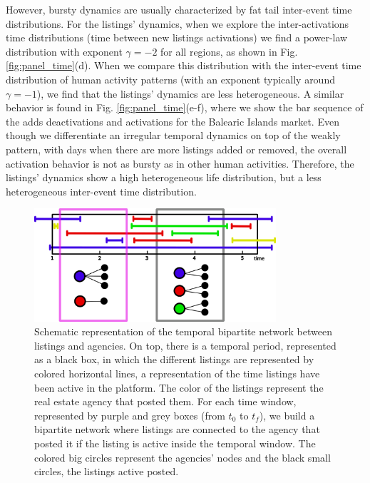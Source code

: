 However, bursty dynamics are usually characterized by fat tail inter-event time distributions. For the listings' dynamics, when we explore the inter-activations time distributions (time between new listings activations) we find a power-law distribution with exponent $\gamma = -2$ for all regions, as shown in Fig. \ref{fig:panel_time}(d). When we compare this distribution with the inter-event time distribution of human activity patterns (with an exponent typically around $\gamma = -1$), we find that the listings' dynamics are less heterogeneous. A similar behavior is found in Fig. \ref{fig:panel_time}(e-f), where we show the bar sequence of the adds deactivations and activations for the Balearic Islands market. Even though we differentiate an irregular temporal dynamics on top of the weakly pattern, with days when there are more listings added or removed, the overall activation behavior is not as bursty as in other human activities. Therefore, the listings' dynamics show a high heterogeneous life distribution, but a less heterogeneous inter-event time distribution.

\begin{figure}
    \vspace{0.2 cm}
    \centering
    \includegraphics[width = 0.8\textwidth]{Figs/Idealista_dynamics/temporal_bipartite.pdf}
	\caption[Housing market as a temporal bipartite network.]{Schematic representation of the temporal bipartite network between listings and agencies. On top, there is a temporal period, represented as a black box, in which the different listings are represented by colored horizontal lines, a representation of the time listings have been active in the platform. The color of the listings represent the real estate agency that posted them. For each time window, represented by purple and grey boxes (from $t_0$ to $t_f$), we build a bipartite network where listings are connected to the agency that posted it if the listing is active inside the temporal window. The colored big circles represent the agencies' nodes and the black small circles, the listings active posted. \label{fig:temporal_bipartite}}
\end{figure}

